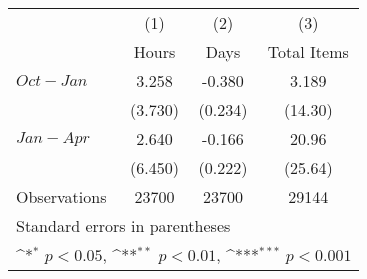 {
\def\sym#1{\ifmmode^{#1}\else\(^{#1}\)\fi}
\begin{tabular}{l*{3}{c}}
\hline\hline
                    &\multicolumn{1}{c}{(1)}&\multicolumn{1}{c}{(2)}&\multicolumn{1}{c}{(3)}\\
                    &\multicolumn{1}{c}{Hours}&\multicolumn{1}{c}{Days}&\multicolumn{1}{c}{Total Items}\\
\hline
$ Oct-Jan $         &       3.258         &      -0.380         &       3.189         \\
                    &     (3.730)         &     (0.234)         &     (14.30)         \\
[1em]
$ Jan-Apr $         &       2.640         &      -0.166         &       20.96         \\
                    &     (6.450)         &     (0.222)         &     (25.64)         \\
\hline
Observations        &       23700         &       23700         &       29144         \\
\hline\hline
\multicolumn{4}{l}{\footnotesize Standard errors in parentheses}\\
\multicolumn{4}{l}{\footnotesize \sym{*} \(p<0.05\), \sym{**} \(p<0.01\), \sym{***} \(p<0.001\)}\\
\end{tabular}
}
